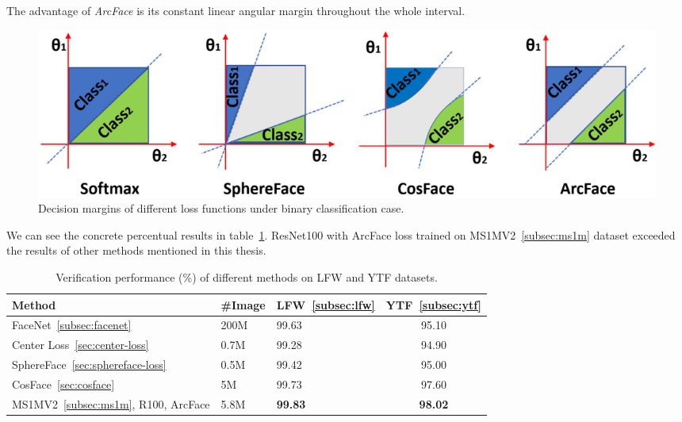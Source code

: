 The advantage of \textit{ArcFace} is its constant linear angular margin throughout the whole interval.

\begin{figure}[H]
    \centering
    \includegraphics[width=\columnwidth]{images/arcface/arcfacecomparison.png}
    \caption{Decision margins of different loss functions under binary classification case.~\cite{ArcFace}}
    \label{fig:arcfacecomp}
\end{figure}

We can see the concrete percentual results in table~\ref{tbl:arcfacecomp}.
ResNet100 with ArcFace loss trained on MS1MV2~\ref{subsec:ms1m} dataset exceeded the results of other methods mentioned
in this thesis.

\begin{table}[H]
    \begin{tabularx}{\textwidth}{l|XXc}
        Method                & \#Image & LFW~\ref{subsec:lfw}            & YTF~\ref{subsec:ytf}            \\ \hline
        FaceNet~\ref{subsec:facenet}               & 200M    & 99.63          & 95.10          \\
        Center Loss~\ref{sec:center-loss}           & 0.7M    & 99.28          & 94.90          \\
        SphereFace~\ref{sec:sphereface-loss}            & 0.5M    & 99.42          & 95.00          \\
        CosFace~\ref{sec:cosface}               & 5M      & 99.73          & 97.60          \\
        MS1MV2~\ref{subsec:ms1m}, R100, ArcFace & 5.8M    & \textbf{99.83} & \textbf{98.02}
    \end{tabularx}
    \caption{Verification performance (\%) of different methods on LFW and YTF datasets.}
    \label{tbl:arcfacecomp}
\end{table}